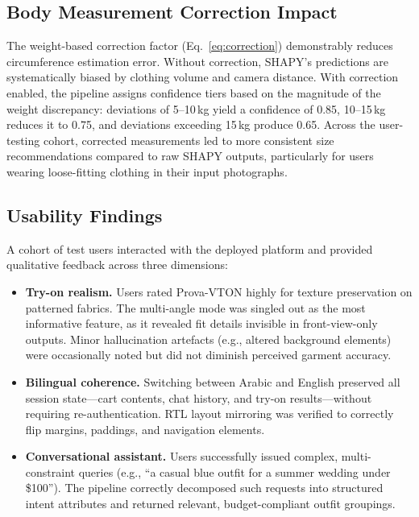 \subsection{Body Measurement Correction Impact}

The weight-based correction factor (Eq.~\ref{eq:correction}) demonstrably reduces circumference estimation error. Without correction, SHAPY's predictions are systematically biased by clothing volume and camera distance. With correction enabled, the pipeline assigns confidence tiers based on the magnitude of the weight discrepancy: deviations of 5--10\,kg yield a confidence of 0.85, 10--15\,kg reduces it to 0.75, and deviations exceeding 15\,kg produce 0.65. Across the user-testing cohort, corrected measurements led to more consistent size recommendations compared to raw SHAPY outputs, particularly for users wearing loose-fitting clothing in their input photographs.

\subsection{Usability Findings}

A cohort of test users interacted with the deployed platform and provided qualitative feedback across three dimensions:

\begin{itemize}[leftmargin=*]
    \item \textbf{Try-on realism.} Users rated Prova-VTON highly for texture preservation on patterned fabrics. The multi-angle mode was singled out as the most informative feature, as it revealed fit details invisible in front-view-only outputs. Minor hallucination artefacts (e.g., altered background elements) were occasionally noted but did not diminish perceived garment accuracy.
    \item \textbf{Bilingual coherence.} Switching between Arabic and English preserved all session state---cart contents, chat history, and try-on results---without requiring re-authentication. RTL layout mirroring was verified to correctly flip margins, paddings, and navigation elements.
    \item \textbf{Conversational assistant.} Users successfully issued complex, multi-constraint queries (e.g., ``a casual blue outfit for a summer wedding under \$100''). The pipeline correctly decomposed such requests into structured intent attributes and returned relevant, budget-compliant outfit groupings.
\end{itemize}

